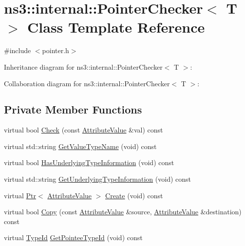 \hypertarget{classns3_1_1internal_1_1PointerChecker}{}\section{ns3\+:\+:internal\+:\+:Pointer\+Checker$<$ T $>$ Class Template Reference}
\label{classns3_1_1internal_1_1PointerChecker}


{\ttfamily \#include $<$pointer.\+h$>$}



Inheritance diagram for ns3\+:\+:internal\+:\+:Pointer\+Checker$<$ T $>$\+:


Collaboration diagram for ns3\+:\+:internal\+:\+:Pointer\+Checker$<$ T $>$\+:
\subsection*{Private Member Functions}
\begin{DoxyCompactItemize}
\item 
virtual bool \hyperlink{classns3_1_1internal_1_1PointerChecker_acad8471435d5cd6c237eca9b27fc1faf}{Check} (const \hyperlink{classns3_1_1AttributeValue}{Attribute\+Value} \&val) const 
\item 
virtual std\+::string \hyperlink{classns3_1_1internal_1_1PointerChecker_a1de6eead99ff22a4aa27e2d936850984}{Get\+Value\+Type\+Name} (void) const 
\item 
virtual bool \hyperlink{classns3_1_1internal_1_1PointerChecker_aefcd4fb409f5c139145c083d8f576c6b}{Has\+Underlying\+Type\+Information} (void) const 
\item 
virtual std\+::string \hyperlink{classns3_1_1internal_1_1PointerChecker_a44c1b1b1330bd49b320c9e74da55cda4}{Get\+Underlying\+Type\+Information} (void) const 
\item 
virtual \hyperlink{classns3_1_1Ptr}{Ptr}$<$ \hyperlink{classns3_1_1AttributeValue}{Attribute\+Value} $>$ \hyperlink{classns3_1_1internal_1_1PointerChecker_a5aefb1bc399b7d30f4272b5bdfe64c4a}{Create} (void) const 
\item 
virtual bool \hyperlink{classns3_1_1internal_1_1PointerChecker_ae2e9cb5a3b02ab291b2582ffd11ec66f}{Copy} (const \hyperlink{classns3_1_1AttributeValue}{Attribute\+Value} \&source, \hyperlink{classns3_1_1AttributeValue}{Attribute\+Value} \&destination) const 
\item 
virtual \hyperlink{classns3_1_1TypeId}{Type\+Id} \hyperlink{classns3_1_1internal_1_1PointerChecker_a31af4cef7de16fb123c6489b0a759111}{Get\+Pointee\+Type\+Id} (void) const 
\end{DoxyCompactItemize}
